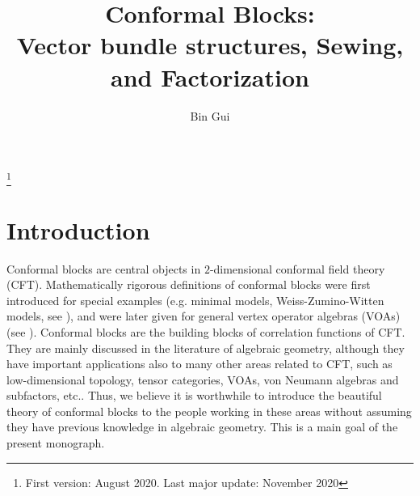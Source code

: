 \documentclass[12pt,a4paper,notitlepage]{report}
\title{Conformal Blocks:\\[0.5ex] \large Vector bundle structures, Sewing, and Factorization}
\author{{\sc Bin Gui}
}
\date{}
\theoremstyle{definition}
\theoremstyle{plain}
\numberwithin{equation}{section}
\begin{document}
\sloppy %



	\maketitle


\newcommand\blfootnote[1]{%
	\begingroup
	\renewcommand\thefootnote{}\footnote{#1}%
	\addtocounter{footnote}{-1}%
	\endgroup
}




\vspace{-0.5cm}
\blfootnote{First version: August 2020. Last major update: November 2020}

\makeatletter
\newcommand*{\toccontents}{}
\makeatother
\toccontents
	












	
	
	
\chapter*{Introduction}	
	
	
	
Conformal blocks are central objects in  $2$-dimensional conformal field theory (CFT). Mathematically rigorous definitions of conformal blocks were first introduced for special examples (e.g. minimal models, Weiss-Zumino-Witten models, see \cite{BFM91,TUY89}), and were later given for general vertex operator algebras (VOAs) (see \cite{Zhu94,FB04}). Conformal blocks  are the building blocks of correlation functions of CFT. They are mainly discussed in the literature of algebraic geometry, although they have important applications also to many other areas related to CFT, such as low-dimensional topology, tensor categories, VOAs, von Neumann algebras and subfactors, etc.. Thus, we believe it is worthwhile to introduce the beautiful theory of conformal blocks to the people working in these areas without assuming they have previous knowledge in algebraic geometry. This is a main goal of the present monograph.
\end{document}
